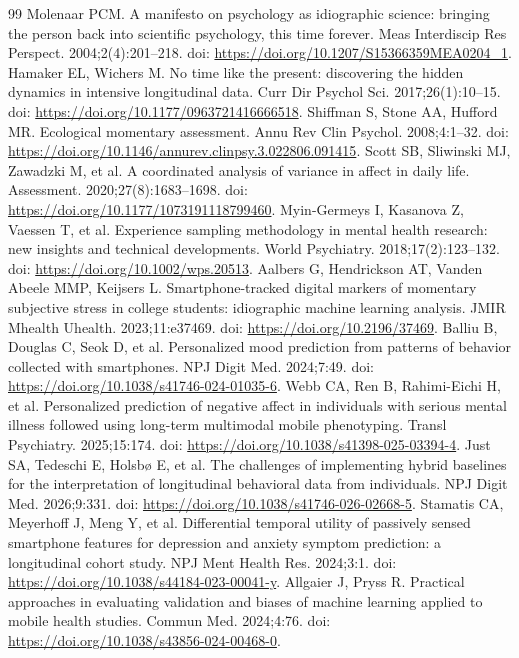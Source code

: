 \documentclass[pdflatex,sn-vancouver-num]{sn-jnl}
\begin{document}
\begin{thebibliography}{99}
 Molenaar PCM. A manifesto on psychology as idiographic science: bringing the person back into scientific psychology, this time forever. Meas Interdiscip Res Perspect. 2004;2(4):201--218. doi: \url{https://doi.org/10.1207/S15366359MEA0204_1}.
 Hamaker EL, Wichers M. No time like the present: discovering the hidden dynamics in intensive longitudinal data. Curr Dir Psychol Sci. 2017;26(1):10--15. doi: \url{https://doi.org/10.1177/0963721416666518}.
 Shiffman S, Stone AA, Hufford MR. Ecological momentary assessment. Annu Rev Clin Psychol. 2008;4:1--32. doi: \url{https://doi.org/10.1146/annurev.clinpsy.3.022806.091415}.
 Scott SB, Sliwinski MJ, Zawadzki M, et al. A coordinated analysis of variance in affect in daily life. Assessment. 2020;27(8):1683--1698. doi: \url{https://doi.org/10.1177/1073191118799460}.
 Myin-Germeys I, Kasanova Z, Vaessen T, et al. Experience sampling methodology in mental health research: new insights and technical developments. World Psychiatry. 2018;17(2):123--132. doi: \url{https://doi.org/10.1002/wps.20513}.
 Aalbers G, Hendrickson AT, Vanden Abeele MMP, Keijsers L. Smartphone-tracked digital markers of momentary subjective stress in college students: idiographic machine learning analysis. JMIR Mhealth Uhealth. 2023;11:e37469. doi: \url{https://doi.org/10.2196/37469}.
 Balliu B, Douglas C, Seok D, et al. Personalized mood prediction from patterns of behavior collected with smartphones. NPJ Digit Med. 2024;7:49. doi: \url{https://doi.org/10.1038/s41746-024-01035-6}.
 Webb CA, Ren B, Rahimi-Eichi H, et al. Personalized prediction of negative affect in individuals with serious mental illness followed using long-term multimodal mobile phenotyping. Transl Psychiatry. 2025;15:174. doi: \url{https://doi.org/10.1038/s41398-025-03394-4}.
 Just SA, Tedeschi E, Holsb\o{} E, et al. The challenges of implementing hybrid baselines for the interpretation of longitudinal behavioral data from individuals. NPJ Digit Med. 2026;9:331. doi: \url{https://doi.org/10.1038/s41746-026-02668-5}.
 Stamatis CA, Meyerhoff J, Meng Y, et al. Differential temporal utility of passively sensed smartphone features for depression and anxiety symptom prediction: a longitudinal cohort study. NPJ Ment Health Res. 2024;3:1. doi: \url{https://doi.org/10.1038/s44184-023-00041-y}.
 Allgaier J, Pryss R. Practical approaches in evaluating validation and biases of machine learning applied to mobile health studies. Commun Med. 2024;4:76. doi: \url{https://doi.org/10.1038/s43856-024-00468-0}.

\end{thebibliography}
\end{document}
